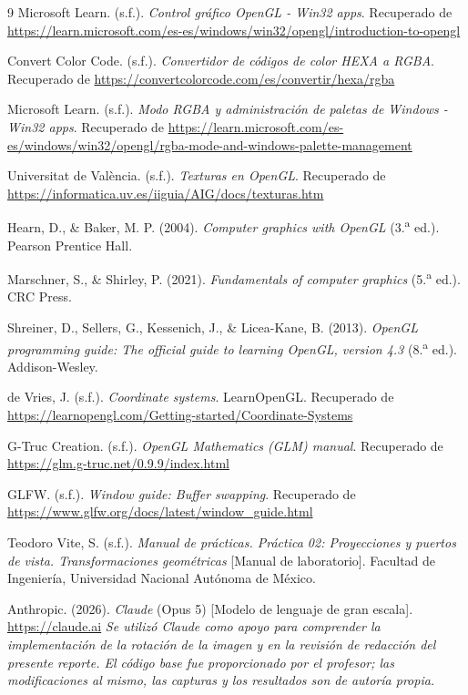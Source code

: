\begin{thebibliography}{9}
  Microsoft Learn. (s.f.). \textit{Control gráfico OpenGL - Win32 apps}. Recuperado de \url{https://learn.microsoft.com/es-es/windows/win32/opengl/introduction-to-opengl}
  
Convert Color Code. (s.f.). \textit{Convertidor de códigos de color HEXA a RGBA}. Recuperado de \url{https://convertcolorcode.com/es/convertir/hexa/rgba}

Microsoft Learn. (s.f.). \textit{Modo RGBA y administración de paletas de Windows - Win32 apps}. Recuperado de \url{https://learn.microsoft.com/es-es/windows/win32/opengl/rgba-mode-and-windows-palette-management}

Universitat de València. (s.f.). \textit{Texturas en OpenGL}. Recuperado de \url{https://informatica.uv.es/iiguia/AIG/docs/texturas.htm}

Hearn, D., \& Baker, M. P. (2004). \textit{Computer graphics with OpenGL} (3.\textsuperscript{a} ed.). Pearson Prentice Hall.

Marschner, S., \& Shirley, P. (2021). \textit{Fundamentals of computer graphics} (5.\textsuperscript{a} ed.). CRC Press.

Shreiner, D., Sellers, G., Kessenich, J., \& Licea-Kane, B. (2013). \textit{OpenGL programming guide: The official guide to learning OpenGL, version 4.3} (8.\textsuperscript{a} ed.). Addison-Wesley.

de Vries, J. (s.f.). \textit{Coordinate systems}. LearnOpenGL. Recuperado de \url{https://learnopengl.com/Getting-started/Coordinate-Systems}

G-Truc Creation. (s.f.). \textit{OpenGL Mathematics (GLM) manual}. Recuperado de \url{https://glm.g-truc.net/0.9.9/index.html}

GLFW. (s.f.). \textit{Window guide: Buffer swapping}. Recuperado de \url{https://www.glfw.org/docs/latest/window_guide.html}

Teodoro Vite, S. (s.f.). \textit{Manual de prácticas. Práctica 02: Proyecciones y puertos de vista. Transformaciones geométricas} [Manual de laboratorio]. Facultad de Ingeniería, Universidad Nacional Autónoma de México.

Anthropic. (2026). \textit{Claude} (Opus 5) [Modelo de lenguaje de gran escala]. \url{https://claude.ai}
\textit{Se utilizó Claude como apoyo para comprender la implementación de la
rotación de la imagen y en la revisión de redacción del presente reporte. El
código base fue proporcionado por el profesor; las modificaciones al mismo, las
capturas y los resultados son de autoría propia.}

\end{thebibliography}
